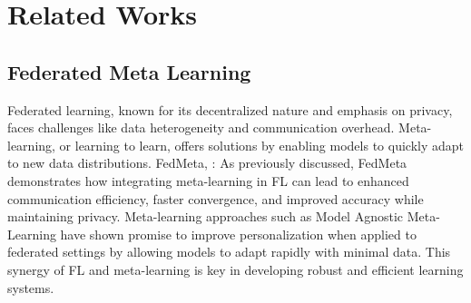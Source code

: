 \documentclass{article} %
\begin{document}




\section{Related Works}
\label{gen_inst}

\subsection{Federated Meta Learning}
Federated learning, known for its decentralized nature and emphasis on privacy, faces challenges like data heterogeneity and communication overhead. Meta-learning, or learning to learn, offers solutions by enabling models to quickly adapt to new data distributions. FedMeta, \cite{fedmeta}: As previously discussed, FedMeta demonstrates how integrating meta-learning in FL can lead to enhanced communication efficiency, faster convergence, and improved accuracy while maintaining privacy. Meta-learning approaches such as Model Agnostic Meta-Learning \cite{maml} have shown promise to improve personalization when applied to federated settings \cite{personalized_fed} by allowing models to adapt rapidly with minimal data. This synergy of FL and meta-learning is key in developing robust and efficient learning systems.
\end{document}
